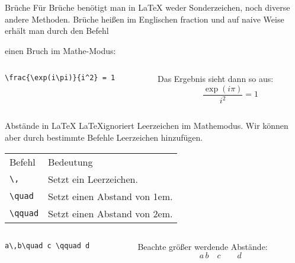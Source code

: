 \begin{frame}[fragile]{Brüche}
Für Brüche benötigt man in \LaTeX{} weder Sonderzeichen, noch diverse andere Methoden. Brüche heißen im Englischen \glqq fraction\grqq{} und auf naive Weise erhält man durch den Befehl
\begin{center}
\end{center}
einen Bruch im Mathe-Modus:
\begin{columns}
\begin{column}{0.55\textwidth}
\begin{codeblock}
\begin{verbatim}
\frac{\exp(i\pi)}{i^2} = 1
\end{verbatim}
\end{codeblock}
\end{column}
\begin{column}{0.35\textwidth}
Das Ergebnis sieht dann so aus:
\[
    \frac{\exp(i\pi)}{i^2} = 1
\]
\end{column}
\end{columns}
\end{frame}


\begin{frame}[fragile]{Abstände in \LaTeX}
\LaTeX ignoriert Leerzeichen im Mathemodus. Wir können aber durch bestimmte Befehle Leerzeichen hinzufügen.\pause
\begin{center}
\begin{tabular}{p{}p{}}
Befehl & Bedeutung\\
\verb+\,+ & Setzt ein Leerzeichen. \\
\verb+\quad+ & Setzt einen Abstand von 1em. \\
\verb+\qquad+ & Setzt einen Abstand von 2em.
\end{tabular}
\end{center}\pause
\begin{columns}
\begin{column}{0.4\textwidth}
\begin{codeblock}
\begin{verbatim}
a\,b\quad c \qquad d
\end{verbatim}
\end{codeblock}
\end{column}
\begin{column}{0.35\textwidth}
Beachte größer werdende Abstände: 
\[
a\,b\quad c \qquad d
\]
\end{column}
\end{columns}
\end{frame}



